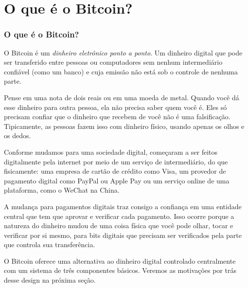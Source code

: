 \part{O que é o Bitcoin?}
\label{ch:capitulo1}
\section*{O que é o Bitcoin?}

O Bitcoin é um \textit{dinheiro eletrônico ponto a ponto}. Um dinheiro digital que pode ser transferido entre pessoas ou computadores sem nenhum intermediário confiável (como um banco) e cuja emissão não está sob o controle de nenhuma parte.

Pense em uma nota de dois reais ou em uma moeda de metal. Quando você dá esse dinheiro para outra pessoa, ela não precisa saber quem você é. Eles só precisam confiar que o dinheiro que recebem de você não é uma falsificação. Tipicamente, as pessoas fazem isso com dinheiro físico, usando apenas os olhos e os dedos.

Conforme mudamos para uma sociedade digital, começaram a ser feitos digitalmente pela internet por meio de um serviço de intermediário, do que fisicamente: uma empresa de cartão de crédito como Visa, um provedor de pagamento digital como PayPal ou Apple Pay ou um serviço online de uma plataforma, como o WeChat na China.

A mudança para pagamentos digitais traz consigo a confiança em uma entidade central que tem que aprovar e verificar cada pagamento. Isso ocorre porque a natureza do dinheiro mudou de uma coisa física que você pode olhar, tocar e verificar por si mesmo, para bits digitais que precisam ser verificados pela parte que controla sua transferência.

O Bitcoin oferece uma alternativa ao dinheiro digital controlado centralmente com um sistema de três componentes básicos. Veremos as motivações por trás desse design na próxima seção.

